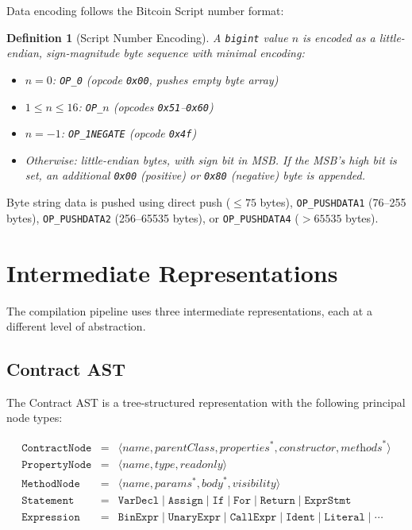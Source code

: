 \documentclass[11pt,a4paper]{article}
\newtheorem{definition}[theorem]{Definition}
\newcommand{\op}[1]{\texttt{OP\_#1}}
\newcommand{\bigintty}{\texttt{bigint}}
\begin{document}
Data encoding follows the Bitcoin Script number format:

\begin{definition}[Script Number Encoding]
A \bigintty{} value $n$ is encoded as a little-endian, sign-magnitude
byte sequence with minimal encoding:
\begin{itemize}[nosep]
  \item $n = 0$: \op{0} (opcode \texttt{0x00}, pushes empty byte array)
  \item $1 \leq n \leq 16$: \op{$n$} (opcodes \texttt{0x51}--\texttt{0x60})
  \item $n = -1$: \op{1NEGATE} (opcode \texttt{0x4f})
  \item Otherwise: little-endian bytes, with sign bit in MSB. If the MSB's
    high bit is set, an additional \texttt{0x00} (positive) or \texttt{0x80}
    (negative) byte is appended.
\end{itemize}
\end{definition}

Byte string data is pushed using direct push ($\leq 75$ bytes),
\op{PUSHDATA1} (76--255 bytes), \op{PUSHDATA2} (256--65535 bytes),
or \op{PUSHDATA4} ($> 65535$ bytes).

\section{Intermediate Representations}
\label{sec:ir}

The compilation pipeline uses three intermediate representations, each at a
different level of abstraction.

\subsection{Contract AST}
\label{sec:ir-ast}

The Contract AST is a tree-structured representation with the following
principal node types:

\[
\begin{array}{rcl}
\texttt{ContractNode} &=& \langle \textit{name}, \textit{parentClass}, \textit{properties}^*, \textit{constructor}, \textit{methods}^* \rangle \\
\texttt{PropertyNode} &=& \langle \textit{name}, \textit{type}, \textit{readonly} \rangle \\
\texttt{MethodNode} &=& \langle \textit{name}, \textit{params}^*, \textit{body}^*, \textit{visibility} \rangle \\
\texttt{Statement} &=& \texttt{VarDecl} \mid \texttt{Assign} \mid \texttt{If} \mid \texttt{For} \mid \texttt{Return} \mid \texttt{ExprStmt} \\
\texttt{Expression} &=& \texttt{BinExpr} \mid \texttt{UnaryExpr} \mid \texttt{CallExpr} \mid \texttt{Ident} \mid \texttt{Literal} \mid \cdots
\end{array}
\]
\end{document}

